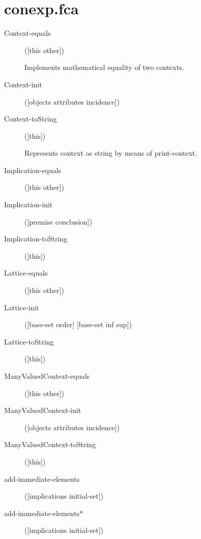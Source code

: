 \section{conexp.fca}
\begin{description}
  \item[Context-equals]
([this other])

Implements mathematical equality of two contexts.

  \item[Context-init]
([objects attributes incidence])



  \item[Context-toString]
([this])

Represents context as string by means of print-context.

  \item[Implication-equals]
([this other])



  \item[Implication-init]
([premise conclusion])



  \item[Implication-toString]
([this])



  \item[Lattice-equals]
([this other])



  \item[Lattice-init]
([base-set order] [base-set inf sup])



  \item[Lattice-toString]
([this])



  \item[ManyValuedContext-equals]
([this other])



  \item[ManyValuedContext-init]
([objects attributes incidence])



  \item[ManyValuedContext-toString]
([this])



  \item[add-immediate-elements]
([implications initial-set])



  \item[add-immediate-elements*]
([implications initial-set])




\end{description}
